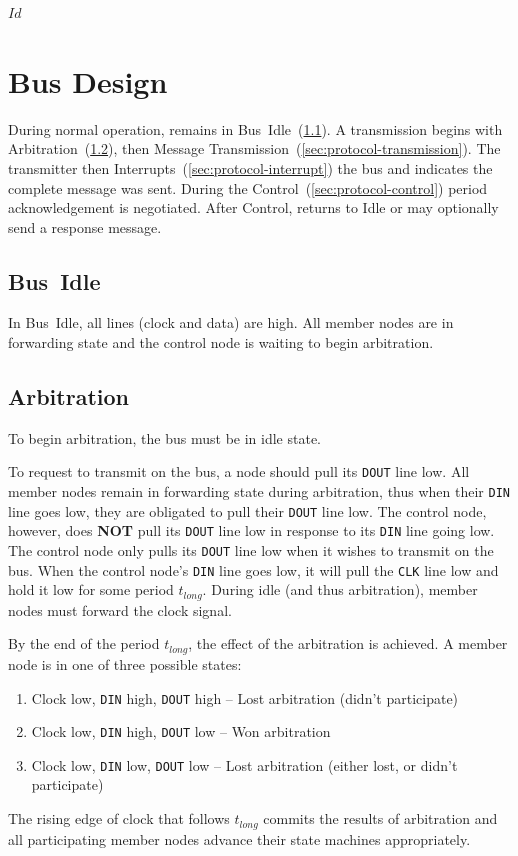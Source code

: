 \svnInfo $Id$

\section{Bus Design}
\label{sec:protocol}
During normal operation, \bus remains in Bus~Idle~(\ref{sec:protocol-idle}).
A transmission begins with Arbitration~(\ref{sec:protocol-arbitration}), then
Message Transmission~(\ref{sec:protocol-transmission}). The transmitter then
Interrupts~(\ref{sec:protocol-interrupt}) the bus and indicates the complete
message was sent. During the Control~(\ref{sec:protocol-control}) period
acknowledgement is negotiated. After Control, \bus returns to Idle or may
optionally send a response message.

\begin{figure}[h!]
  \figTimingArbitration
\end{figure}

\subsection{Bus~Idle}
\label{sec:protocol-idle}
In \bus Bus~Idle, all lines (clock and data) are high. All member nodes are in
forwarding state and the control node is waiting to begin arbitration.

\subsection{Arbitration}
\label{sec:protocol-arbitration}
To begin arbitration, the bus must be in idle state.

To request to transmit on the bus, a node should pull its {\tt DOUT} line low.
All member nodes remain in forwarding state during arbitration, thus when
their {\tt DIN} line goes low, they are obligated to pull their {\tt DOUT}
line low. The control node, however, does {\bf NOT} pull its {\tt DOUT} line
low in response to its {\tt DIN} line going low. The control node only pulls
its {\tt DOUT} line low when it wishes to transmit on the bus. When the
control node's {\tt DIN} line goes low, it will pull the {\tt CLK} line low
and hold it low for some period $t_{long}$. During {\sc idle} (and thus
arbitration), member nodes must forward the clock signal.

By the end of the period $t_{long}$, the effect of the arbitration is
achieved. A member node is in one of three possible states:
\begin{enumerate}
  \item Clock low, {\tt DIN} high, {\tt DOUT} high -- Lost arbitration
    (didn't participate)
  \item Clock low, {\tt DIN} high, {\tt DOUT} low -- Won arbitration
  \item Clock low, {\tt DIN} low, {\tt DOUT} low -- Lost arbitration
    (either lost, or didn't participate)
\end{enumerate}
The rising edge of clock that follows $t_{long}$ commits the results of
arbitration and all participating member nodes advance their state machines
appropriately.

